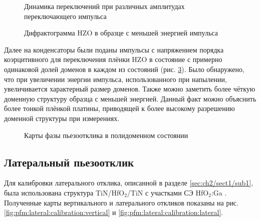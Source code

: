 \begin{figure}[ht]
    \caption[Этот текст попадает в названия рисунков в списке рисунков]{Динамика переключений при различных амплитудах переключающего импульса}\label{fig:pfm:polydomain:hyst}
\end{figure}

\begin{figure}[ht]
    \caption{Дифрактограмма HZO в образце с меньшей энергией импульса}\label{fig:xrd}
\end{figure}

Далее на конденсаторы были поданы импульсы с напряжением порядка коэрцитивного для переключения плёнки HZO в состояние с примерно одинаковой долей доменов в каждом из состояний (рис. \cref{fig:pfm:polydomain}). Было обнаружено, что при увеличении энергии импульса, использованного при напылении, увеличивается характерный размер доменов. Также можно заметить более чёткую доменную структуру образца с меньшей энергией. Данный факт можно объяснить более тонкой плёнкой платины, приводящей к более высокому разрешению доменной структуры при измерениях.

\begin{figure}[ht]
    \caption{Карты фазы пьезоотклика в полидоменном состоянии}\label{fig:pfm:polydomain}
\end{figure}



\subsection{Латеральный пьезоотклик}

Для калибровки латерального отклика, описанной в разделе \cref{sec:ch2/sect1/sub1}, была использована структура TiN/HfO\(_2\)/TiN с участками СЭ HfO\(_2\):Ga \cite{chouprikNanoscaleTailoringFerroelectricity2020}. Полученные карты вертикального и латерального откликов показаны на рис. \cref{fig:pfm:lateral:calibration:vertical} и \cref{fig:pfm:lateral:calibration:lateral}.

